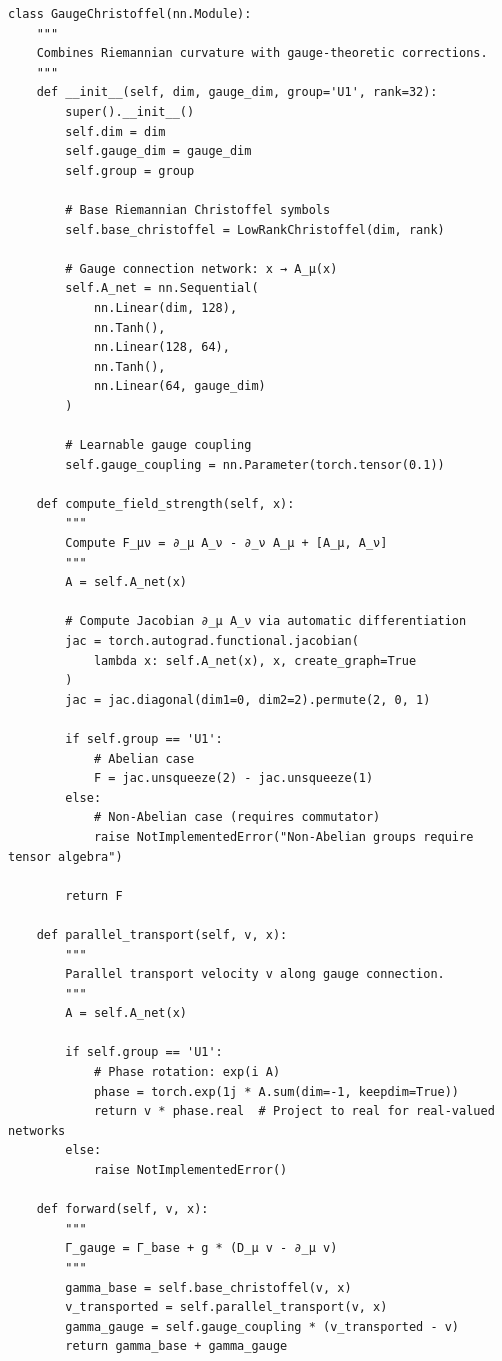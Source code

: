 \documentclass[12pt,letterpaper,twoside]{article}
\begin{document}
\begin{verbatim}
class GaugeChristoffel(nn.Module):
    """
    Combines Riemannian curvature with gauge-theoretic corrections.
    """
    def __init__(self, dim, gauge_dim, group='U1', rank=32):
        super().__init__()
        self.dim = dim
        self.gauge_dim = gauge_dim
        self.group = group
        
        # Base Riemannian Christoffel symbols
        self.base_christoffel = LowRankChristoffel(dim, rank)
        
        # Gauge connection network: x → A_μ(x)
        self.A_net = nn.Sequential(
            nn.Linear(dim, 128),
            nn.Tanh(),
            nn.Linear(128, 64),
            nn.Tanh(),
            nn.Linear(64, gauge_dim)
        )
        
        # Learnable gauge coupling
        self.gauge_coupling = nn.Parameter(torch.tensor(0.1))
    
    def compute_field_strength(self, x):
        """
        Compute F_μν = ∂_μ A_ν - ∂_ν A_μ + [A_μ, A_ν]
        """
        A = self.A_net(x)
        
        # Compute Jacobian ∂_μ A_ν via automatic differentiation
        jac = torch.autograd.functional.jacobian(
            lambda x: self.A_net(x), x, create_graph=True
        )
        jac = jac.diagonal(dim1=0, dim2=2).permute(2, 0, 1)
        
        if self.group == 'U1':
            # Abelian case
            F = jac.unsqueeze(2) - jac.unsqueeze(1)
        else:
            # Non-Abelian case (requires commutator)
            raise NotImplementedError("Non-Abelian groups require tensor algebra")
        
        return F
    
    def parallel_transport(self, v, x):
        """
        Parallel transport velocity v along gauge connection.
        """
        A = self.A_net(x)
        
        if self.group == 'U1':
            # Phase rotation: exp(i A)
            phase = torch.exp(1j * A.sum(dim=-1, keepdim=True))
            return v * phase.real  # Project to real for real-valued networks
        else:
            raise NotImplementedError()
    
    def forward(self, v, x):
        """
        Γ_gauge = Γ_base + g * (D_μ v - ∂_μ v)
        """
        gamma_base = self.base_christoffel(v, x)
        v_transported = self.parallel_transport(v, x)
        gamma_gauge = self.gauge_coupling * (v_transported - v)
        return gamma_base + gamma_gauge
\end{verbatim}
\end{document}
